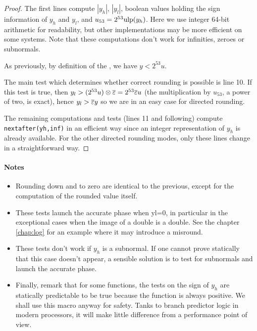 \begin{proof}
  The first lines compute $|y_h|$, $|y_l|$, boolean values holding the
  sign information of $y_h$ and $y_l$, and $u_{53}=2^{53}\mbox{ulp}(y_h)$.
  Here we use integer 64-bit arithmetic for readability, but other
  implementations may be more efficient on some systems. Note that
  these computations don't work for infinities, zeroes or subnormals.
  
  As previously, by definition of the \ulp, we have  $y<2^{53}u$.
  
  The main test which determines whether correct rounding is possible
  is line 10. If this test is true, then $y_l>(2^{53}u)\otimes{\overline{\varepsilon}}
  = 2^{53}{\overline{\varepsilon}} u $ (the multiplication by $u_{53}$, a power of two,
  is exact), hence $y_l>{\overline{\varepsilon}} y$ so we are in an easy case for
  directed rounding.

  The remaining computations and tests (lines 11 and following)
  compute \texttt{nextafter(yh,inf)} in an efficient way since an
  integer representation of $y_h$ is already available. For the other
  directed rounding modes, only these lines change in a
  straightforward way.
\end{proof}





\paragraph*{Notes}
\begin{itemize}
\item Rounding down and to zero are identical to the previous, except
  for the computation of the rounded value itself.

\item These tests launch the accurate phase when yl=0, in particular
  in the exceptional cases when the image of a double is a double. See
  the chapter \ref{chap:log}
for  an example where it may introduce a misround.

\item These tests don't work if $y_h$ is a subnormal. If one cannot
  prove statically that this case doesn't appear, a sensible solution
  is to test for subnormals and launch the accurate phase.

\item Finally, remark that for some functions, the tests on the sign of
  $y_h$ are statically predictable to be true because the function is
  always positive. We shall use this macro anyway for safety. Tanks to
  branch predictor logic in modern processors, it will make little
  difference from a performance point of view.
\end{itemize}









